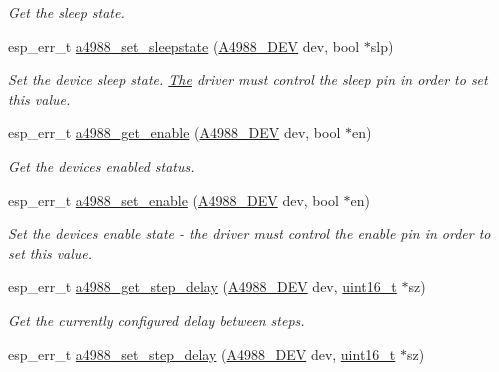 \begin{DoxyCompactItemize}
\begin{DoxyCompactList}\small\item\em Get the sleep state. \end{DoxyCompactList}\item 
esp\+\_\+err\+\_\+t \hyperlink{group__A4988__Driver__functions_gafe87a246c0e96cec94f730677c70f96d}{a4988\+\_\+set\+\_\+sleepstate} (\hyperlink{group__A4988__definitions_ga16590a9dd79ad8fcf4c317be2659b6c5}{A4988\+\_\+\+D\+EV} dev, bool $\ast$slp)
\begin{DoxyCompactList}\small\item\em Set the device sleep state. \hyperlink{structThe}{The} driver must control the sleep pin in order to set this value. \end{DoxyCompactList}\item 
esp\+\_\+err\+\_\+t \hyperlink{group__A4988__Driver__functions_ga06cdb3eee313296b14112378b6fede82}{a4988\+\_\+get\+\_\+enable} (\hyperlink{group__A4988__definitions_ga16590a9dd79ad8fcf4c317be2659b6c5}{A4988\+\_\+\+D\+EV} dev, bool $\ast$en)
\begin{DoxyCompactList}\small\item\em Get the device\textquotesingle{}s enabled status. \end{DoxyCompactList}\item 
esp\+\_\+err\+\_\+t \hyperlink{group__A4988__Driver__functions_gabfef3cf1f7be7216983e91510c43dd92}{a4988\+\_\+set\+\_\+enable} (\hyperlink{group__A4988__definitions_ga16590a9dd79ad8fcf4c317be2659b6c5}{A4988\+\_\+\+D\+EV} dev, bool $\ast$en)
\begin{DoxyCompactList}\small\item\em Set the device\textquotesingle{}s enable state -\/ the driver must control the enable pin in order to set this value. \end{DoxyCompactList}\item 
esp\+\_\+err\+\_\+t \hyperlink{group__A4988__Driver__functions_ga326f6130f475404923b17e3ef940721d}{a4988\+\_\+get\+\_\+step\+\_\+delay} (\hyperlink{group__A4988__definitions_ga16590a9dd79ad8fcf4c317be2659b6c5}{A4988\+\_\+\+D\+EV} dev, \hyperlink{vl53l0x__types_8h_a273cf69d639a59973b6019625df33e30}{uint16\+\_\+t} $\ast$sz)
\begin{DoxyCompactList}\small\item\em Get the currently configured delay between steps. \end{DoxyCompactList}\item 
esp\+\_\+err\+\_\+t \hyperlink{group__A4988__Driver__functions_gade65c56d4fb7d4058d7ebae0a95567c9}{a4988\+\_\+set\+\_\+step\+\_\+delay} (\hyperlink{group__A4988__definitions_ga16590a9dd79ad8fcf4c317be2659b6c5}{A4988\+\_\+\+D\+EV} dev, \hyperlink{vl53l0x__types_8h_a273cf69d639a59973b6019625df33e30}{uint16\+\_\+t} $\ast$sz)

\end{DoxyCompactItemize}
